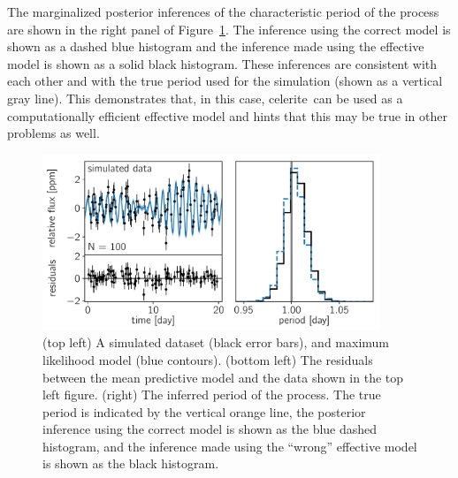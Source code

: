 \documentclass[manuscript, letterpaper]{aastex6}
\makeatletter
\let\origsubsection\subsection
\renewcommand\subsection{\@ifstar{\starsubsection}{\nostarsubsection}}
\newcommand\nostarsubsection[1]{\subsectionprelude\origsubsection{#1}}
\newcommand\starsubsection[1]{\subsectionprelude\origsubsection*{#1}}
\newcommand\subsectionprelude{\vspace{1em}}
\newcommand{\project}[1]{\textsf{#1}}
\newcommand{\celerite}{\project{celerite}}
\newcommand{\figureref}[1]{\ref{fig:#1}}
\newcommand{\Figure}[1]{Figure~\figureref{#1}}
\newcommand{\figurelabel}[1]{\label{fig:#1}}
\newcommand{\sectlabel}[1]{\label{sect:#1}}
\makeatother
\begin{document}
{The marginalized posterior inferences of the characteristic period of the
process are shown in the right panel of \Figure{simulated-wrong}.
The inference using the correct model is shown as a dashed blue histogram and
the inference made using the effective model is shown as a solid black
histogram.
These inferences are consistent with each other and with the true period used
for the simulation (shown as a vertical gray line).
This demonstrates that, in this case, \celerite\ can be used as a
computationally efficient effective model and hints that this may be true in
other problems as well.
}



\begin{figure}[!htbp]
\begin{center}
\includegraphics[width=0.9\textwidth]{figures/simulated/wrong-qpo.pdf}
\caption{(top left) A simulated dataset (black error bars), and maximum
    likelihood model (blue contours).
    (bottom left) The residuals between the mean predictive model and the data
    shown in the top left figure.
    (right) The inferred period of the process. The true period is indicated
    by the vertical orange line, the posterior inference using the correct
    model is shown as the blue dashed histogram, and the inference made using
    the ``wrong'' effective model is shown as the black histogram.
    \figurelabel{simulated-wrong}}
\end{center}
\end{figure}


\subsection{Example 3: Stellar rotation} \sectlabel{rotation}
\end{document}
